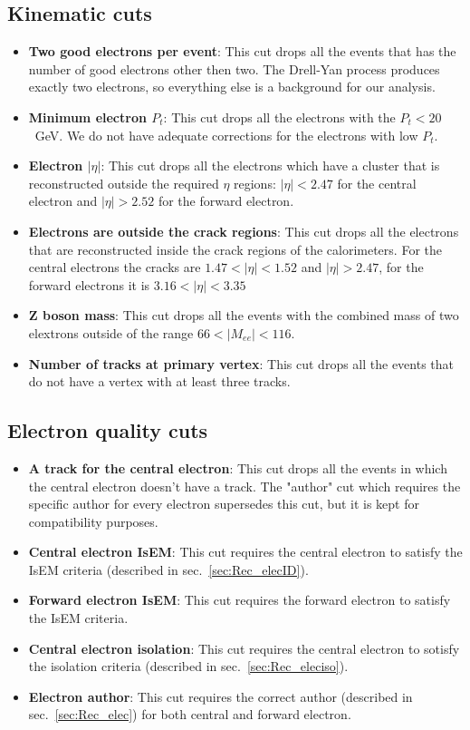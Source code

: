 \subsection{Kinematic cuts}
\label{sec:Sel_kinematic}

\begin{itemize}
\item {\bfseries Two good electrons per event}: This cut drops all the events that has the number of good electrons other then two. The Drell-Yan process produces exactly two electrons, so everything else is a background for our analysis.
\item {\bfseries Minimum electron $P_{t}$}: This cut drops all the electrons with the $P_{t} < 20$~GeV. We do not have adequate corrections for the electrons with low $P_{t}$.
\item {\bfseries Electron $|\eta|$}: This cut drops all the electrons which have a cluster that is reconstructed outside the required $\eta$ regions: $|\eta| < 2.47$ for the central electron and $|\eta| > 2.52$ for the forward electron.
\item {\bfseries Electrons are outside the crack regions}: This cut drops all the electrons that are reconstructed inside the crack regions of the calorimeters. For the central electrons the cracks are $1.47 < |\eta| < 1.52$ and $|\eta| > 2.47$, for the forward electrons it is $3.16 < |\eta| < 3.35$
\item {\bfseries Z boson mass}: This cut drops all the events with the combined mass of two elextrons outside of the range $66 < |M_{ee}| < 116$.
\item {\bfseries Number of tracks at primary vertex}: This cut drops all the events that do not have a vertex with at least three tracks.
\end{itemize}

\subsection{Electron quality cuts}
\label{sec:Sel_isem_iso}

\begin{itemize}
\item {\bfseries A track for the central electron}: This cut drops all the events in which the central electron doesn't have a track. The "author" cut which requires the specific author for every electron supersedes this cut, but it is kept for compatibility purposes.
\item {\bfseries Central electron IsEM}: This cut requires the central electron to satisfy the IsEM criteria (described in sec.~\ref{sec:Rec_elecID}).
\item {\bfseries Forward electron IsEM}: This cut requires the forward electron to satisfy the IsEM criteria.
\item {\bfseries Central electron isolation}: This cut requires the central electron to sotisfy the isolation criteria (described in sec.~\ref{sec:Rec_eleciso}).
\item {\bfseries Electron author}: This cut requires the correct author (described in sec.~\ref{sec:Rec_elec}) for both central and forward electron.
\end{itemize}

